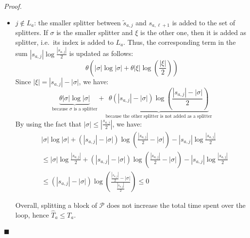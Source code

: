 \documentclass[12pt, a4 paper]{article}
\renewenvironment{proof}[1][Proof]{\begin{mdframed}[backgroundcolor=black!5, topline=false, rightline=false, bottomline=false, linecolor=black!15, linewidth=3pt]{\noindent\textit{#1.}\ }}{\noindent\par\hfill$\blacksquare$\end{mdframed}}
\theoremstyle{definition}
\begin{document}
\begin{proof}
\begin{itemize}
        \item $j \notin L_a$: the smaller splitter between $\tilde{s}_{a, j}$ and $s_{a, \ell + 1}$ is added to the set of splitters. If $\sigma$ is the smaller splitter and $\xi$ is the other one, then it is added as splitter, i.e.\ its index is added to $L_a$. Thus, the corresponding term in the sum $\left| s_{a, j} \right| \log \frac{\left| s_{a, j} \right|}{2}$ is updated as follows:
        \begin{equation*}
            \theta \left(\left| \sigma \right| \log \left| \sigma \right| + \theta \left| \xi \right| \log \left(\frac{\left| \xi \right|}{2}\right)\right)
        \end{equation*}
        Since $\left| \xi \right| = \left| s_{a, j}\right| - \left| \sigma \right|$, we have:
        \begin{equation*}
            \underset{\text{because $\sigma$ is a splitter}}{\underbrace{\theta \left| \sigma \right| \log \left| \sigma \right|}} + \underset{\text{because the other splitter is not added as a splitter}}{\underbrace{\theta (\left| s_{a, j} \right| - \left| \sigma \right|) \log \left(\frac{\left| s_{a, j} \right| - \left| \sigma \right|}{2}\right)}}
        \end{equation*}
        By using the fact that $\left| \sigma \right| \leq \left| \frac{s_{a, j}}{2} \right|$, we have:
        \begin{align*}
            & \left| \sigma \right| \log \left| \sigma \right| + (\left| s_{a, j} \right| - \left| \sigma \right|)\log \left(\frac{\left| s_{a, j} \right|}{2} - \left| \sigma \right|\right) - \left| s_{a, j} \right| \log \frac{\left| s_{a, j} \right|}{2} \\
            & \leq \left| \sigma \right| \log \frac{\left| s_{a, j} \right|}{2} + (\left| s_{a, j} \right| - \left| \sigma \right|) \log \left(\frac{\left| s_{a, j} \right|}{2} - \left| \sigma \right|\right) - \left| s_{a, j} \right| \log \frac{\left| s_{a, j} \right|}{2} \\
            & \leq (\left| s_{a, j} \right| - \left| \sigma \right|) \log \left(\frac{\frac{\left| s_{a, j} \right|}{2} - \left| \sigma \right|}{\frac{\left| s_{a, j}\right|}{2}}\right) \leq 0
        \end{align*}

        Overall, splitting a block of $\mathcal{P}$ does not increase the total time spent over the loop, hence $\hat{T}_a \leq T_a$.
    \end{itemize}
\end{proof}
\end{document}
